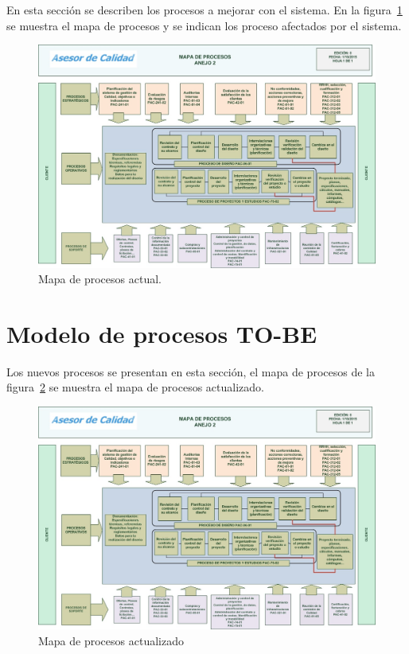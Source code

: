 
En esta sección se describen los procesos a mejorar con el sistema. En la figura~\ref{fig:mapaProc} se muestra el mapa de procesos y se indican los proceso afectados por el sistema.

\begin{figure}[htbp]
	\begin{center}
		\includegraphics[width=.8\textwidth]{images/mapaProc}
		\caption{Mapa de procesos actual.}
		\label{fig:mapaProc}
	\end{center}
\end{figure}


%
%
%

\section{Modelo de procesos TO-BE}


Los nuevos procesos se presentan en esta sección, el mapa de procesos de la figura~\ref{fig:mapaProcNvo} se muestra el mapa de procesos actualizado.

\begin{figure}[htbp]
	\begin{center}
		\includegraphics[width=.8\textwidth]{images/mapaProc}
		\caption{Mapa de procesos actualizado}
		\label{fig:mapaProcNvo}
	\end{center}
\end{figure}



%
%
%

